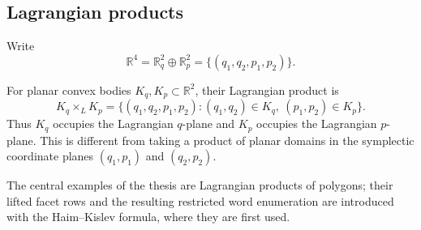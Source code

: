 \subsection{Lagrangian products}
\label{subsec:preliminaries-lagrangian-products}

Write
\[
  \mathbb R^4=\mathbb R_q^2\oplus\mathbb R_p^2
  =\{(q_1,q_2,p_1,p_2)\}.
\]
\begin{definition}
\label{def:preliminaries-lagrangian-product}
For planar convex bodies \(K_q,K_p\subset\mathbb R^2\), their Lagrangian
product is
\begin{equation}\label{eq:preliminaries-lagrangian-product}
  K_q\times_L K_p
  =\{(q_1,q_2,p_1,p_2):(q_1,q_2)\in K_q,\ (p_1,p_2)\in K_p\}.
\end{equation}
Thus \(K_q\) occupies the Lagrangian \(q\)-plane and \(K_p\) occupies the
Lagrangian \(p\)-plane.  This is different from taking a product of planar
domains in the symplectic coordinate planes \((q_1,p_1)\) and \((q_2,p_2)\).
\end{definition}

The central examples of the thesis are Lagrangian products of polygons; their
lifted facet rows and the resulting restricted word enumeration are introduced
with the Haim--Kislev formula, where they are first used.
